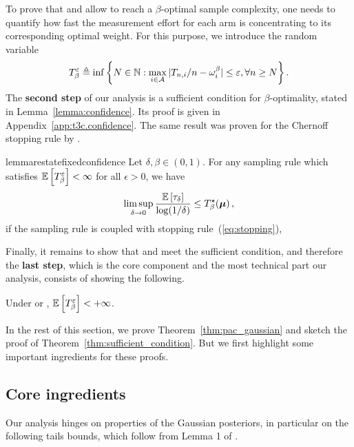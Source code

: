 To prove that \TTTS and \TCC allow to reach a $\beta$-optimal sample complexity, one needs to quantify how fast the measurement effort for each arm is concentrating to its corresponding optimal weight. For this purpose,  we introduce the random variable
\[
    T_{\beta}^\varepsilon \triangleq \inf \left\{ N\in{\mathbb N}: \max_{i\in\mathcal{A}} \vert T_{n,i}/n-\omega_i^\beta \vert \leq \varepsilon, \forall n \geq N \right\}.
\]
The \textbf{second step} of our analysis is a sufficient condition for $\beta$-optimality, stated in Lemma~\ref{lemma:confidence}. Its proof is given in Appendix~\ref{app:t3c.confidence}. The same result was proven for the Chernoff stopping rule by \cite{qin2017ttei}.

\begin{restatable}{lemma}{restatefixedconfidence}\label{lemma:confidence}
    Let $\delta,\beta\in (0,1)$. For any sampling rule which satisfies $\mathbb{E}\left[T_{\beta}^\varepsilon\right] < \infty$ for all $\epsilon > 0$, we have
    \[
        \limsup_{\delta\rightarrow{0}} \frac{\mathbb{E}\left[\tau_{\delta}\right]}{\log(1/\delta)} \leq T_{\beta}^\star({\boldsymbol \mu})\,,
    \]
    if the sampling rule is coupled with stopping rule~(\ref{eq:stopping}), 
\end{restatable}

Finally, it remains to show that \TTTS and \TCC meet the sufficient condition, and therefore the \textbf{last step}, which is the core component and the most technical part our analysis, consists of showing the following.

\begin{theorem}\label{thm:sufficient_condition}
    Under \TTTS or \TCC, $\mathbb{E}\left[T_{\beta}^\varepsilon\right] < +\infty$.
\end{theorem}


In the rest of this section, we prove Theorem~\ref{thm:pac_gaussian} and sketch the proof of Theorem~\ref{thm:sufficient_condition}. But we first highlight some important ingredients for these proofs.

\subsection{Core ingredients}

Our analysis hinges on properties of the Gaussian posteriors, in particular on the following tails bounds, which follow from Lemma 1 of \cite{qin2017ttei}.

